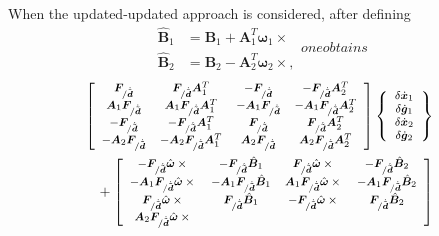 \documentclass[10pt,fleqn,subeqn]{report}
\newcommand{\T}[1]{\bm{#1}}
\newcommand{\TT}[1]{\bm{#1}}
\begin{document}
When the updated-updated approach is considered,
after defining
\begin{subequations}
\begin{align}
	\hat{\TT{B}}_1 &= \TT{B}_1 + \TT{A}_1^T \T{\omega}_1\times{}
	\\
	\hat{\TT{B}}_2 &= \TT{B}_2 - \TT{A}_2^T \T{\omega}_2\times{}
	,
\end{align}
one obtains
\end{subequations}
\begin{align}
	\footnotesize
	\sqbr{\matr{cccc}{
		\T{F}_{/\dot{\tilde{\T{d}}}} 
		& \T{F}_{/\dot{\tilde{\T{d}}}} \TT{A}_1^T
		& - \T{F}_{/\dot{\tilde{\T{d}}}}
		& - \T{F}_{/\dot{\tilde{\T{d}}}} \TT{A}_2^T \\
%
		\TT{A}_1 \T{F}_{/\dot{\tilde{\T{d}}}} 
		& \TT{A}_1 \T{F}_{/\dot{\tilde{\T{d}}}} \TT{A}_1^T
		& - \TT{A}_1 \T{F}_{/\dot{\tilde{\T{d}}}}
		& - \TT{A}_1 \T{F}_{/\dot{\tilde{\T{d}}}} \TT{A}_2^T \\
%
		- \T{F}_{/\dot{\tilde{\T{d}}}} 
		& - \T{F}_{/\dot{\tilde{\T{d}}}} \TT{A}_1^T
		& \T{F}_{/\dot{\tilde{\T{d}}}}
		& \T{F}_{/\dot{\tilde{\T{d}}}} \TT{A}_2^T \\
%
		- \TT{A}_2 \T{F}_{/\dot{\tilde{\T{d}}}} 
		& - \TT{A}_2 \T{F}_{/\dot{\tilde{\T{d}}}} \TT{A}_1^T
		& \TT{A}_2 \T{F}_{/\dot{\tilde{\T{d}}}}
		& \TT{A}_2 \T{F}_{/\dot{\tilde{\T{d}}}} \TT{A}_2^T
	}} \cubr{\cvvect{
		\delta\dot{\T{x}}_1 \\
		\delta\dot{\T{g}}_1 \\
		\delta\dot{\T{x}}_2 \\
		\delta\dot{\T{g}}_2
	}} & \nonumber \\
	\footnotesize
	\mbox{} + \sqbr{\matr{cccc}{
		- \T{F}_{/\dot{\tilde{\T{d}}}} \hat{\T{\omega}}\times{}
		& - \T{F}_{/\dot{\tilde{\T{d}}}} \hat{\TT{B}}_1
		& \T{F}_{/\dot{\tilde{\T{d}}}} \hat{\T{\omega}}\times{}
		& - \T{F}_{/\dot{\tilde{\T{d}}}} \hat{\TT{B}}_2 \\
%
		- \TT{A}_1 \T{F}_{/\dot{\tilde{\T{d}}}} \hat{\T{\omega}}\times{}
		& - \TT{A}_1 \T{F}_{/\dot{\tilde{\T{d}}}} \hat{\TT{B}}_1
		& \TT{A}_1 \T{F}_{/\dot{\tilde{\T{d}}}} \hat{\T{\omega}}\times{}
		& - \TT{A}_1 \T{F}_{/\dot{\tilde{\T{d}}}} \hat{\TT{B}}_2 \\
%
		\T{F}_{/\dot{\tilde{\T{d}}}} \hat{\T{\omega}}\times{}
		& \T{F}_{/\dot{\tilde{\T{d}}}} \hat{\TT{B}}_1
		& - \T{F}_{/\dot{\tilde{\T{d}}}} \hat{\T{\omega}}\times{}
		& \T{F}_{/\dot{\tilde{\T{d}}}} \hat{\TT{B}}_2 \\
%
		\TT{A}_2 \T{F}_{/\dot{\tilde{\T{d}}}} \hat{\T{\omega}}\times{}
}}
\end{align}
\end{document}
